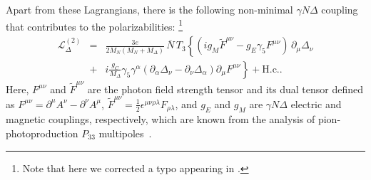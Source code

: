 \documentclass[prc,twocolumn,showpacs,preprintnumbers,amsmath,amssymb
,superscriptaddress,a4paper,nofootinbib
]{revtex4-1}
\begin{document}

Apart from these Lagrangians, there is the following non-minimal $\gamma N\Delta$ coupling~\cite{Pascalutsa:2005ts} that contributes
to the polarizabilities: \footnote{Note that here we corrected a typo appearing in \cite{Pascalutsa:2005ts,Pascalutsa:2005vq,Pascalutsa:2006up}.}
\begin{eqnarray}
\mathcal{L}^{(2)}_\Delta &=&  \frac{3e}{2M_N(M_N+M_\Delta)}\,\overline N\, T_3\left\{
\left(i g_M  \tilde F^{\mu\nu} - g_E \gamma_5 F^{\mu\nu}\right)\,\partial_{\mu}\Delta_\nu\right. \nonumber\\
&+&\left.i \frac{g_C}{M_\Delta}\gamma_5 \gamma^\alpha (\partial_\alpha \Delta_\nu-\partial_\nu \Delta_\alpha)\partial_\mu F^{\mu \nu} \right\}+\mbox{H.c.}.
\end{eqnarray}
Here, $F^{\mu\nu}$ and $\tilde F^{\mu\nu}$ are the photon field strength tensor and its dual tensor defined
as $F^{\mu\nu}=\partial^\mu A^\nu-\partial^\nu A^\mu$, $\tilde F^{\mu\nu}=\frac{1}{2}\epsilon^{\mu\nu\rho\lambda}F_{\rho\lambda}$,
and  $g_E$ and $g_M$ are $\gamma N\Delta$ electric and magnetic couplings, respectively,
which are known from the analysis of pion-photoproduction $P_{33}$ multipoles~\cite{Pascalutsa:2005ts}.
\end{document}
